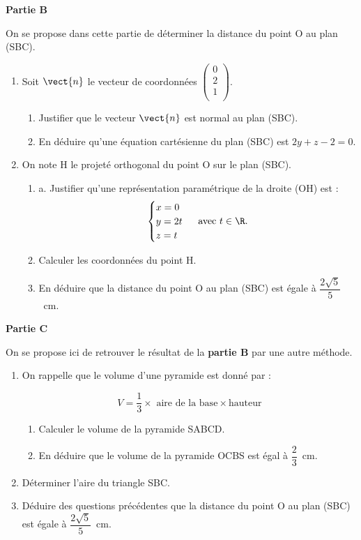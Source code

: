 \textbf{Partie B}

On se propose dans cette partie de déterminer la distance du point O au plan (SBC).

\begin{enumerate}
\item Soit $\vect{n}$ le vecteur de coordonnées $\begin{pmatrix} 0\\ 2\\ 1\\ \end{pmatrix}$.
	\begin{enumerate}
		\item Justifier que le vecteur $\vect{n}$ est normal au plan (SBC).
		\item En déduire qu'une équation cartésienne du plan (SBC) est \quad $2 y+z-2=0$.
	\end{enumerate}
	\item On note H le projeté orthogonal du point O sur le plan (SBC).
		\begin{enumerate}
			\item a. Justifier qu'une représentation paramétrique de la droite (OH) est :
			\[\begin{cases}
			x =0\\
			y =2t\\
			z =t\\
			\end{cases}\text{ avec } t \in \R.\]
			\item Calculer les coordonnées du point H.
			\item En déduire que la distance du point O au plan (SBC) est égale à $\dfrac{2 \sqrt{5}}{5}$~cm.
		\end{enumerate}
	\end{enumerate}

\textbf{Partie C}

On se propose ici de retrouver le résultat de la \textbf{partie B} par une autre méthode.

\begin{enumerate}
\item On rappelle que le volume d'une pyramide est donné par :

\[V =\dfrac{1}{3} \times \text{ aire de la base} \times \text{hauteur}\]

	\begin{enumerate}
		\item Calculer le volume de la pyramide SABCD.
		\item En déduire que le volume de la pyramide OCBS est égal à $\dfrac{2}{3}$~cm.
	\end{enumerate}
\item Déterminer l'aire du triangle SBC.
\item Déduire des questions précédentes que la distance du point O au plan (SBC) est égale à $\dfrac{2 \sqrt{5}}{5}$~cm.
\end{enumerate}

